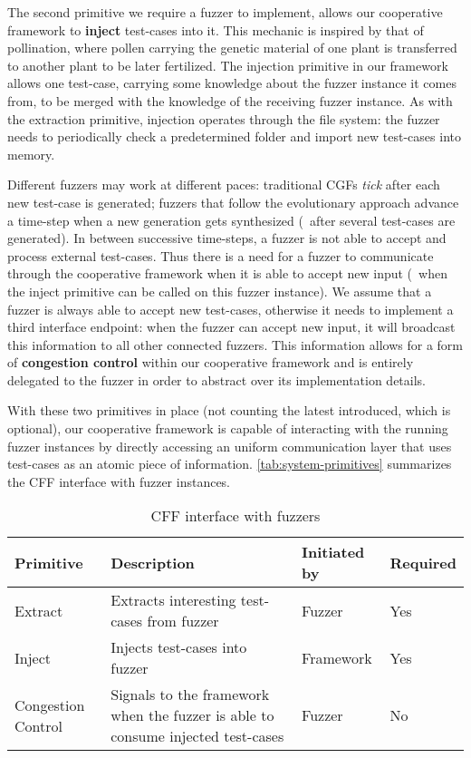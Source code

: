 The second primitive we require a fuzzer to implement, allows our cooperative
framework to \textbf{inject} test-cases into it. This mechanic is inspired by
that of pollination, where pollen carrying the genetic material of one plant is
transferred to another plant to be later fertilized. The injection primitive in
our framework allows one test-case, carrying some knowledge about the fuzzer
instance it comes from, to be merged with the knowledge of the receiving fuzzer
instance. As with the extraction primitive, injection operates through the file
system: the fuzzer needs to periodically check a predetermined folder and import
new test-cases into memory.

Different fuzzers may work at different paces: traditional \acp{CGF} \emph{tick}
after each new test-case is generated; fuzzers that follow the evolutionary
approach advance a time-step when a new generation gets synthesized (\eg~after
several test-cases are generated). In between successive time-steps, a fuzzer is
not able to accept and process external test-cases. Thus there is a need for a
fuzzer to communicate through the cooperative framework when it is able to
accept new input (\eg~when the inject primitive can be called on this fuzzer
instance). We assume that a fuzzer is always able to accept new test-cases,
otherwise it needs to implement a third interface endpoint: when the fuzzer can
accept new input, it will broadcast this information to all other connected
fuzzers. This information allows for a form of \textbf{congestion control}
within our cooperative framework and is entirely delegated to the fuzzer in
order to abstract over its implementation details.

With these two primitives in place (not counting the latest introduced, which is
optional), our cooperative framework is capable of interacting with the running
fuzzer instances by directly accessing an uniform communication layer that uses
test-cases as an atomic piece of information. \autoref{tab:system-primitives}
summarizes the \ac{CFF} interface with fuzzer instances.

\begin{table}[h]
    \centering
    \begin{tabularx}{\textwidth}{X >{\raggedright}p{} X p{}}
        \textbf{Primitive} & \textbf{Description} & \textbf{Initiated by} & \textbf{Required} \\
        \bottomrule
        Extract & Extracts interesting test-cases from fuzzer & Fuzzer & Yes \\
        Inject & Injects test-cases into fuzzer & Framework & Yes \\
        Congestion Control & Signals to the framework when the fuzzer is able to
            consume injected test-cases & Fuzzer & No
    \end{tabularx}
\caption{\acl{CFF} interface with fuzzers}
\label{tab:system-primitives}
\end{table}

